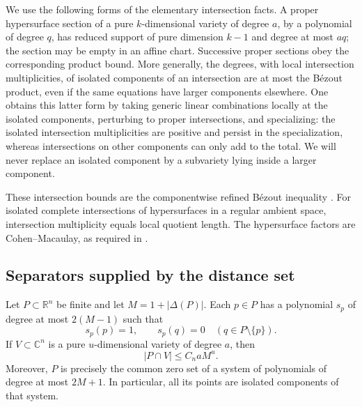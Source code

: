 We use the following forms of the elementary intersection facts.  A proper hypersurface section of a pure $k$-dimensional variety of degree $a$, by a polynomial of degree $q$, has reduced support of pure dimension $k-1$ and degree at most $aq$; the section may be empty in an affine chart.  Successive proper sections obey the corresponding product bound. More generally, the degrees, with local intersection multiplicities, of isolated components of an intersection are at most the B\'ezout product, even if the same equations have larger components elsewhere.  One obtains this latter form by taking generic linear combinations locally at the isolated components, perturbing to proper intersections, and specializing: the isolated intersection multiplicities are positive and persist in the specialization, whereas intersections on other components can only add to the total.  We will never replace an isolated component by a subvariety lying inside a larger component.

These intersection bounds are the componentwise refined B\'ezout inequality \cite[Theorem~12.3 and Example~12.3.1]{Ful}. For isolated complete intersections of hypersurfaces in a regular ambient space, intersection multiplicity equals local quotient length. The hypersurface factors are Cohen--Macaulay, as required in \cite[Example~12.3.7(ii)--(iii)]{Ful}.

\subsection{Separators supplied by the distance set}

\begin{lemma}\label{lem:poly-separators}
Let $P\subset\mathbb{R}^n$ be finite and let $M=1+|\Delta(P)|$.  Each $p\in P$ has a polynomial $s_p$ of degree at most $2(M-1)$ such that
\[
 s_p(p)=1,\qquad s_p(q)=0\quad(q\in P\setminus\{p\}).
\]
If $V\subset\mathbb{C}^n$ is a pure $u$-dimensional variety of degree $a$, then
\begin{equation}\label{eq:poly-physical-count}
 |P\cap V|\le C_n aM^u.
\end{equation}
Moreover, $P$ is precisely the common zero set of a system of polynomials of degree at most $2M+1$.  In particular, all its points are isolated components of that system.
\end{lemma}

